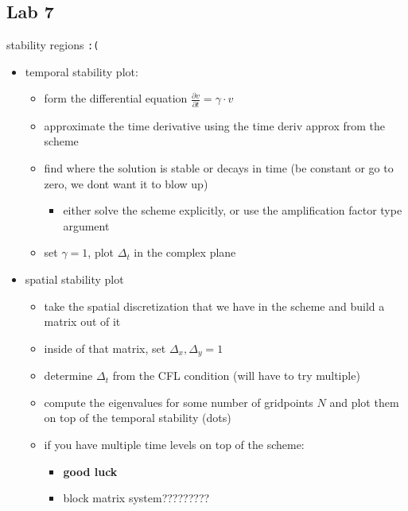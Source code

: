 \documentclass[
]{article}
\providecommand{\tightlist}{%
  \setlength{\itemsep}{0pt}\setlength{\parskip}{0pt}}
\begin{document}
\hypertarget{lab-7}{%
\subsection{Lab 7}\label{lab-7}}

stability regions \texttt{:(}

\begin{itemize}
\tightlist
\item
  temporal stability plot:

  \begin{itemize}
  \tightlist
  \item
    form the differential equation
    \(\frac{\partial v}{\partial t} = \gamma \cdot v\)
  \item
    approximate the time derivative using the time deriv approx from the
    scheme
  \item
    find where the solution is stable or decays in time (be constant or
    go to zero, we dont want it to blow up)

    \begin{itemize}
    \tightlist
    \item
      either solve the scheme explicitly, or use the amplification
      factor type argument
    \end{itemize}
  \item
    set \(\gamma = 1\), plot \(\Delta_t\) in the complex plane
  \end{itemize}
\item
  spatial stability plot

  \begin{itemize}
  \tightlist
  \item
    take the spatial discretization that we have in the scheme and build
    a matrix out of it
  \item
    inside of that matrix, set \(\Delta_x, \Delta_y = 1\)
  \item
    determine \(\Delta_t\) from the CFL condition (will have to try
    multiple)
  \item
    compute the eigenvalues for some number of gridpoints \(N\) and plot
    them on top of the temporal stability (dots)
  \item
    if you have multiple time levels on top of the scheme:

    \begin{itemize}
    \tightlist
    \item
      \textbf{good luck}
    \item
      block matrix system?????????
    \end{itemize}
  \end{itemize}
\end{itemize}
\end{document}
